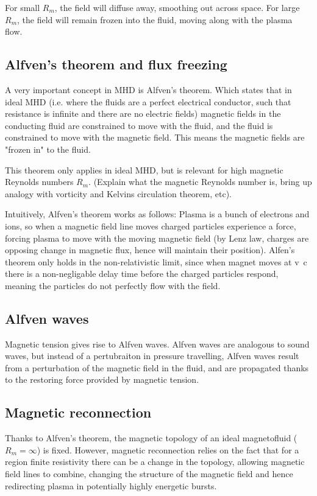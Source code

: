 For small $R_m$, the field will diffuse away, smoothing out across space. For large $R_m$, the field will remain frozen into the fluid, moving along with the plasma flow.

\subsection{Alfven's theorem and flux freezing}

A very important concept in MHD is Alfven's theorem. Which states that in ideal MHD (i.e. where the fluids are a perfect electrical conductor, such that resistance is infinite and there are no electric fields) magnetic fields in the conducting fluid are constrained to move with the fluid, and the fluid is constrained to move with the magnetic field. This means the magnetic fields are "frozen in" to the fluid. 

This theorem only applies in ideal MHD, but is relevant for high magnetic Reynolds numbers $R_m$. (Explain what the magnetic Reynolds number is, bring up analogy with vorticity and Kelvins circulation theorem, etc).

Intuitively, Alfven's theorem works as follows: Plasma is a bunch of electrons and ions, so when a magnetic field line moves charged particles experience a force, forcing plasma to move with the moving magnetic field (by Lenz law, charges are opposing change in magnetic flux, hence will maintain their position). Alfen's theorem only holds in the non-relativistic limit, since when magnet moves at v~c there is a non-negligable delay time before the charged particles respond, meaning the particles do not perfectly flow with the field.


\subsection{Alfven waves}

Magnetic tension gives rise to Alfven waves. Alfven waves are analogous to sound waves, but instead of a pertubraiton in pressure travelling, Alfven waves result from a perturbation of the magnetic field in the fluid, and are propagated thanks to the restoring force provided by magnetic tension.

\subsection{Magnetic reconnection}
Thanks to Alfven's theorem, the magnetic topology of an ideal magnetofluid ($R_m=\infty$) is fixed. However, magnetic reconnection relies on the fact that for a region finite resistivity there can be a change in the topology, allowing magnetic field lines to combine, changing the structure of the magnetic field and hence redirecting plasma in potentially highly energetic bursts.

